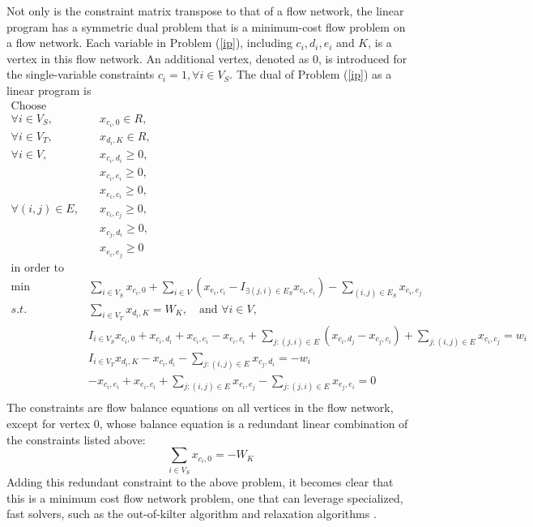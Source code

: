 \documentclass[review]{siamart0216}
\begin{document}
Not only is the constraint matrix transpose to that of a flow network,
the linear program has a symmetric dual problem that is
a minimum-cost flow problem on a flow network.  Each variable
in Problem (\ref{ip}), including $c_i, d_i, e_i$ and $K$,
is a vertex in this flow network.  An additional vertex, denoted as 0,
is introduced for the single-variable constraints
$c_i = 1,\forall i \in V_S$.  The dual of Problem (\ref{ip}) as
a linear program is
\begin{equation} \label{dual_lp} \begin{split}
    \mbox{Choose} \; & \\
    \forall i\in V_S, & \quad x_{c_i,0}\in R, \\
    \forall i\in V_T, & \quad x_{d_i,K}\in R, \\
    \forall i\in V,   & \quad x_{c_i,d_i}\ge 0, \\
                      & \quad x_{c_i,e_i}\ge 0, \\
                      & \quad x_{e_i,c_i}\ge 0, \\
    \forall (i,j)\in E, & \quad x_{c_i,c_j} \ge 0, \\
                        & \quad x_{c_j,d_i} \ge 0, \\
                        & \quad x_{e_i,e_j} \ge 0 \\
    \mbox{in order to} \; & \\
    \min \quad & \sum_{i\in V_S} x_{c_i,0} + \sum_{i\in V} (x_{e_i,c_i} -
                 I_{\exists (j,i)\in E_S} x_{c_i,e_i})
               - \sum_{(i,j)\in E_S} x_{e_i, e_j} \\
    s.t. \quad
    & \sum_{i\in V_T} x_{d_i,K} = W_K, \quad
    \mbox{and } \forall i\in V, \\
    & I_{i\in V_S} x_{c_i,0} +
      x_{c_i, d_i} + x_{c_i, e_i} - x_{e_i, c_i} +
     \sum_{j: (j,i)\in E} (x_{c_i, d_j} - x_{c_j, c_i}) +
      \sum_{j: (i,j)\in E} x_{c_i, c_j} = w_i \\
    & I_{i\in V_T} x_{d_i, K} - x_{c_i, d_i} -
      \sum_{j: (i,j)\in E} x_{c_j, d_i} = -w_i \\
    & -x_{c_i, e_i} + x_{e_i, c_i} + \sum_{j:(i,j)\in E} x_{e_i,e_j}
      - \sum_{j:(j,i)\in E} x_{e_j,e_i} = 0 \\
\end{split} \end{equation}
The constraints are flow balance equations on all vertices in the flow network,
except for vertex 0, whose balance equation is a redundant linear combination
of the constraints listed above:
\[ \sum_{i\in V_S} x_{c_i,0} = -W_K \]
Adding this redundant constraint to the above problem, it becomes clear
that this is a minimum cost flow network problem\cite{}, one that
can leverage specialized, fast solvers, such as the out-of-kilter
algorithm\cite{} and relaxation algorithms \cite{}.
\end{document}

